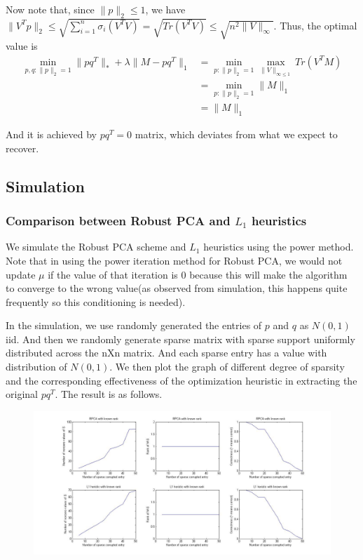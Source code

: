 Now note that, since $\|p\|_{2}\le1$, we have $\|V^{T}p\|_{2}\le\sqrt{\sum_{i=1}^{n}\sigma_{i}(V^{T}V)}=\sqrt{Tr(V^{T}V)}\le\sqrt{n^{2}\|V\|_{\infty}}$.
Thus, the optimal value is
\begin{align*}
\min_{p,q:\|p\|_{2}=1}\|pq^{T}\|_{*}+\lambda\|M-pq^{T}\|_{1}
& = \min_{p:\|p\|_{2}=1}\max_{\|V\|_{\infty\le1}}Tr(V^{T}M)\\
& = \min_{p:\|p\|_{2}=1}\|M\|_{1}\\
& = \|M\|_{1}
\end{align*}


And it is achieved by $pq^{T}=0$ matrix, which deviates from what
we expect to recover.


\subsection{Simulation }


\subsubsection{Comparison between Robust PCA and $L_{1}$ heuristics}

We simulate the Robust PCA scheme and $L_{1}$ heuristics using the
power method. Note that in using the power iteration method for Robust
PCA, we would not update $\mu$ if the value of that iteration is
0 because this will make the algorithm to converge to the wrong value(as
observed from simulation, this happens quite frequently so this conditioning
is needed).

In the simulation, we use randomly generated the entries of $p$ and
$q$ as $N(0,1)$ iid. And then we randomly generate sparse matrix
with sparse support uniformly distributed across the nXn matrix. And
each sparse entry has a value with distribution of $N(0,1)$. We then
plot the graph of different degree of sparsity and the corresponding
effectiveness of the optimization heuristic in extracting the original
$pq^{T}$. The result is as follows.

\begin{figure}[h!]
\label{fig:comparison}
\centering
\includegraphics[width=16cm]{../figures/compare.jpg}
\end{figure}


